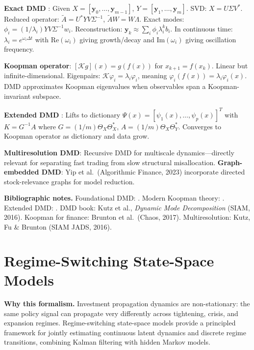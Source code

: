 \documentclass[11pt,a4paper]{article}
\theoremstyle{definition}
\newcommand{\by}{\bm{y}}
\begin{document}
\begin{appendices}
\textbf{Exact DMD} \citep{tu2014dynamic}: Given $X = [\by_0, \ldots, \by_{m-1}]$, $Y = [\by_1, \ldots, \by_m]$. SVD: $X = U\Sigma V^*$. Reduced operator: $\tilde{A} = U^*YV\Sigma^{-1}$, $\tilde{A}W = W\Lambda$. Exact modes: $\phi_i = (1/\lambda_i)YV\Sigma^{-1}w_i$. Reconstruction: $\by_k \approx \sum_i \phi_i\lambda_i^k b_i$. In continuous time: $\lambda_i = e^{\omega_i\Delta t}$ with $\mathrm{Re}(\omega_i)$ giving growth/decay and $\mathrm{Im}(\omega_i)$ giving oscillation frequency.

\textbf{Koopman operator}: $[\mathcal{K}g](x) = g(f(x))$ for $x_{k+1} = f(x_k)$. Linear but infinite-dimensional. Eigenpairs: $\mathcal{K}\varphi_i = \lambda_i\varphi_i$, meaning $\varphi_i(f(x)) = \lambda_i\varphi_i(x)$. DMD approximates Koopman eigenvalues when observables span a Koopman-invariant subspace.

\textbf{Extended DMD} \citep{williams2015data}: Lifts to dictionary $\Psi(x) = [\psi_1(x),\ldots,\psi_p(x)]^T$ with $K = G^{-1}A$ where $G = (1/m)\Theta_X\Theta_X^*$, $A = (1/m)\Theta_X\Theta_Y^*$. Converges to Koopman operator as dictionary and data grow.

\textbf{Multiresolution DMD}: Recursive DMD for multiscale dynamics---directly relevant for separating fast trading from slow structural misallocation. \textbf{Graph-embedded DMD}: Yip et al.\ (Algorithmic Finance, 2023) incorporate directed stock-relevance graphs for model reduction.

\textbf{Bibliographic notes.} Foundational DMD: \citet{tu2014dynamic}. Modern Koopman theory: \citet{brunton2022modern}. Extended DMD: \citet{williams2015data}. DMD book: Kutz et al., \emph{Dynamic Mode Decomposition} (SIAM, 2016). Koopman for finance: Brunton et al.\ (Chaos, 2017). Multiresolution: Kutz, Fu \& Brunton (SIAM JADS, 2016).


\section{Regime-Switching State-Space Models}
\label{app:regime_switching}

\textbf{Why this formalism.} Investment propagation dynamics are non-stationary: the same policy signal can propagate very differently across tightening, crisis, and expansion regimes. Regime-switching state-space models provide a principled framework for jointly estimating continuous latent dynamics and discrete regime transitions, combining Kalman filtering with hidden Markov models.


\end{appendices}
\end{document}

